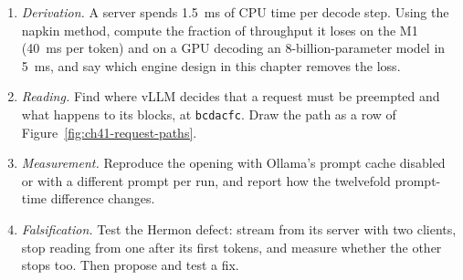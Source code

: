 \ExercisesSection

\begin{enumerate}
\item \emph{Derivation.} A server spends 1.5~ms of CPU time per decode step. Using
  the napkin method, compute the fraction of throughput it loses on the M1
  (40~ms per token) and on a GPU decoding an 8-billion-parameter model in 5~ms, and
  say which engine design in this chapter removes the loss.
\item \emph{Reading.} Find where vLLM decides that a request must be preempted
  and what happens to its blocks, at \texttt{bcdacfc}. Draw the path as a row of
  Figure~\ref{fig:ch41-request-paths}.
\item \emph{Measurement.} Reproduce the opening with Ollama's prompt cache
  disabled or with a different prompt per run, and report how the twelvefold
  prompt-time difference changes.
\item \emph{Falsification.} Test the Hermon defect: stream from its server with
  two clients, stop reading from one after its first tokens, and measure whether
  the other stops too. Then propose and test a fix.
\end{enumerate}
